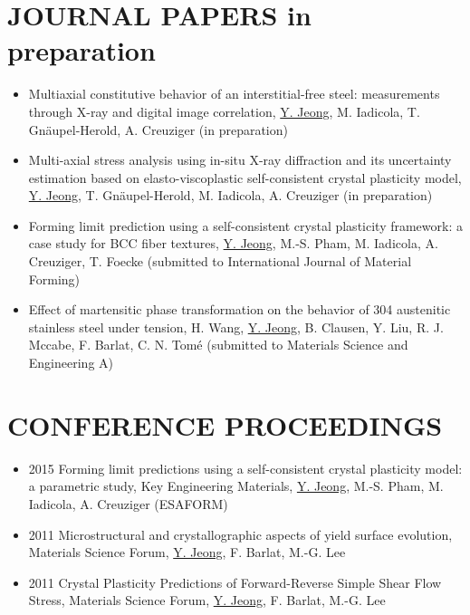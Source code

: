 \documentclass{res}
\begin{document}
\begin{resume}
  \section{JOURNAL PAPERS in preparation}
  \begin{itemize}
  \item Multiaxial constitutive behavior of an interstitial-free steel: measurements through X-ray and digital image correlation, \underline{Y. Jeong}, M. Iadicola, T. Gn\"{a}upel-Herold, A. Creuziger (in preparation)
  \item Multi-axial stress analysis using in-situ X-ray diffraction and its uncertainty estimation based on elasto-viscoplastic self-consistent crystal plasticity model, \underline{Y. Jeong}, T. Gn\"{a}upel-Herold, M. Iadicola, A. Creuziger (in preparation)
  \item Forming limit prediction using a self-consistent crystal plasticity framework: a case study for BCC fiber textures, \underline{Y. Jeong}, M.-S. Pham, M. Iadicola, A. Creuziger, T. Foecke (submitted to International Journal of Material Forming)
  \item Effect of martensitic phase transformation on the behavior of 304 austenitic stainless steel under tension, H. Wang, \underline{Y. Jeong}, B. Clausen, Y. Liu, R. J. Mccabe, F. Barlat, C. N. Tom\'{e} (submitted to Materials Science and Engineering A)
  \end{itemize}


  \section{CONFERENCE PROCEEDINGS}
  \begin{itemize}
  \item 2015 Forming limit predictions using a self-consistent crystal plasticity model: a parametric study, Key Engineering Materials, \underline{Y. Jeong}, M.-S. Pham, M. Iadicola, A. Creuziger (ESAFORM)
  \item 2011 Microstructural and crystallographic aspects of yield surface evolution, Materials Science Forum, \underline{Y. Jeong}, F. Barlat, M.-G. Lee
  \item 2011 Crystal Plasticity Predictions of Forward-Reverse Simple Shear Flow Stress, Materials Science Forum, \underline{Y. Jeong}, F. Barlat, M.-G. Lee
  \end{itemize}


\end{resume}
\end{document}
